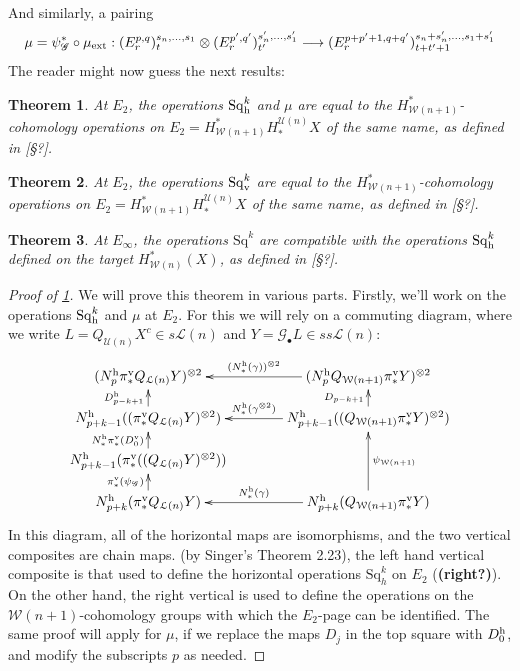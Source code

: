 \documentclass[11pt]{amsart}
\theoremstyle{plain}
\newtheorem{thm}{Theorem}[section]
\theoremstyle{definition}
\renewcommand{\to}{\longrightarrow}
\newcommand{\scrQ}{\mathscr{Q}}
\newcommand{\scrR}{\mathscr{R}}
\newcommand{\scrT}{\mathscr{T}}
\newcommand{\scrY}{\mathscr{Y}}
\newcommand{\scrI}{\mathscr{I}}
\newcommand{\scrO}{\mathscr{O}}
\newcommand{\scrP}{\mathscr{P}}
\newcommand{\scrS}{\mathscr{S}}
\newcommand{\scrG}{\mathscr{G}}
\newcommand{\scrH}{\mathscr{H}}
\newcommand{\scrJ}{\mathscr{J}}
\newcommand{\scrK}{\mathscr{K}}
\newcommand{\scrL}{\mathscr{L}}
\newcommand{\scrZ}{\mathscr{Z}}
\newcommand{\scrN}{\mathscr{N}}
\newcommand{\scrM}{\mathscr{M}}
\newcommand{\calW}{\mathcal{W}}
\newcommand{\calU}{\mathcal{U}}
\newcommand{\calL}{\mathcal{L}}
\theoremstyle{plain}
\newcommand{\BSW}{{\scrG}}%
\newcommand{\BSWres}{{\scrG_\bullet}}
\newcommand{\ExtCohProd}{\mu_\textup{ext}}
\newcommand{\Sq}{\mathrm{Sq}}
\begin{document}
\begin{Composite functor spectral sequences}
And similarly, a pairing
\[\mu=\psi_{\BSW}^*\circ\ExtCohProd:(E^{p,q}_r)^{s_n,\ldots,s_1}_t\otimes (E^{p',q'}_r)^{s'_n,\ldots,s'_1}_{t'}\to (E^{p+p'+1,q+q'}_r)^{s_n+s'_n,\ldots,s_1+s'_1}_{t+t'+1}\]
The reader might now guess the next results:
\begin{thm}\label{E2CompFuncLieOperationsID}
At $E_2$, the operations $\Sq_\textup{h}^k$ and $\mu$ are equal to the $H^*_{\calW(n+1)}$-cohomology operations on $E_2=H^*_{\calW(n+1)}H_*^{\calU(n)}X$ of the same name, as defined in [\S?].
\end{thm}
\begin{thm}\label{E2CompFuncKosOperationsID}
At $E_2$, the operations $\Sq_\textup{v}^k$ are equal to the $H^*_{\calW(n+1)}$-cohomology operations on $E_2=H^*_{\calW(n+1)}H_*^{\calU(n)}X$ of the same name, as defined in [\S?].
\end{thm}
\begin{thm}\label{EInftyCompFuncOperationsID}
At $E_\infty$, the operations $\Sq^k$ are compatible with the operations $\Sq^k_\textup{h}$ defined on the target $H^*_{\calW(n)}(X)$, as defined in [\S?].
\end{thm} 
\begin{proof}[Proof of \ref{E2CompFuncLieOperationsID}]
We will prove this theorem in various parts. Firstly, we'll work on the operations $\Sq_\textup{h}^k$ and $\mu$ at $E_2$.
For this we will rely on a commuting diagram, where we write $L=Q_{\calU(n)}X^c\in s\calL(n)$ and $Y=\BSWres L\in ss\calL(n)$:
\[\xymatrix@C=13mm@R=4mm{
(N_p^\textup{h}\pi_*^{\textup{v}}Q_{\calL(n)}Y)^{\otimes2}&%
(N_p^\textup{h}Q_{\calW(n+1)}\pi_*^{\textup{v}}Y)^{\otimes2}
\ar[l]_-{(N^\textup{h}_*(\gamma))^{\otimes 2}}
\\%
N_{p+k-1}^\textup{h}((\pi_*^{\textup{v}}Q_{\calL(n)}Y)^{\otimes2})
\ar[u]^-{D_{p-k+1}^\textup{h}}
&%
N_{p+k-1}^\textup{h}((Q_{\calW(n+1)}\pi_*^{\textup{v}}Y)^{\otimes2})
\ar[u]^-{D_{p-k+1}}
\ar[l]_-{N^\textup{h}_*(\gamma^{\otimes 2})}
\\%
N_{p+k-1}^\textup{h}(\pi_*^{\textup{v}}((Q_{\calL(n)}Y)^{\otimes2}))
\ar[u]^-{N^\textup{h}_*\pi_*^\textup{v}(D_0^\textup{v})}
&%
\\%
N^\textup{h}_{p+k}(\pi_*^{\textup{v}} Q_{\calL(n)}Y)
\ar[u]^-{\pi_*^\textup{v}(\psi_{\BSW})}
&%
N^\textup{h}_{p+k}(Q_{\calW(n+1)}\pi_*^{\textup{v}} Y)
\ar[uu]_-{\psi_{\calW(n+1)}}
\ar[l]_-{N^\textup{h}_*(\gamma)}
}\]
In this diagram, all of the horizontal maps are isomorphisms, and the two vertical composites are chain maps. (by Singer's Theorem 2.23),  the left hand vertical composite is that used to define the horizontal operations $\Sq^{k}_h$ on $E_2$ (\textbf{(right?)}). On the other hand, the right vertical is used to define the operations on the $\calW(n+1)$-cohomology groups with which the $E_2$-page can be identified. The same proof will apply for $\mu$, if we replace the maps $D_j$ in the top square with $D_0^\textup{h}$, and modify the subscripts $p$ as needed.


\end{proof}
\end{Composite functor spectral sequences}
\end{document}
